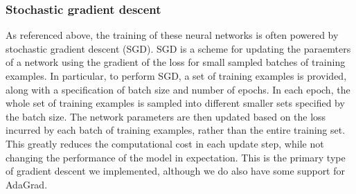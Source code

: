 \subsubsection{Stochastic gradient descent}
As referenced above, the training of these neural networks is often powered by stochastic gradient descent (SGD).
SGD is a scheme for updating the paraemters of a network using the gradient of the loss for small sampled batches of training examples.
In particular, to perform SGD, a set of training examples is provided, along with a specification of batch size and number of epochs.
In each epoch, the whole set of training examples is sampled into different smaller sets specified by the batch size.
The network parameters are then updated based on the loss incurred by each batch of training examples, rather than the entire training set.
This greatly reduces the computational cost in each update step, while not changing the performance of the model in expectation.
This is the primary type of gradient descent we implemented, although we do also have some support for AdaGrad.





